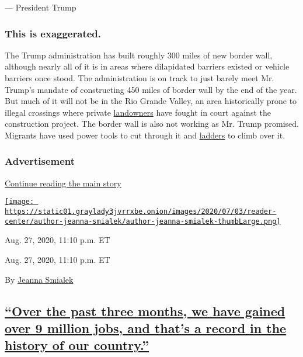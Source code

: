 --- President Trump

\hypertarget{this-is-exaggerated--2}{%
\subsubsection{This is exaggerated. }\label{this-is-exaggerated--2}}

The Trump administration has built roughly 300 miles of new border wall,
although nearly all of it is in areas where dilapidated barriers existed
or vehicle barriers once stood. The administration is on track to just
barely meet Mr. Trump's mandate of constructing 450 miles of border wall
by the end of the year. But much of it will not be in the Rio Grande
Valley, an area historically prone to illegal crossings where private
\href{https://www.nytimes3xbfgragh.onion/2020/05/29/us/politics/border-wall-coronavirus.html}{landowners}
have fought in court against the construction project. The border wall
is also not working as Mr. Trump promised. Migrants have used power
tools to cut through it and
\href{https://www.nytimes3xbfgragh.onion/2019/12/26/us/politics/trump-border-wall.html}{ladders}
to climb over it.

\hypertarget{advertisement-4}{%
\subsubsection{Advertisement}\label{advertisement-4}}

\protect\hyperlink{after-dfp-ad-mid5}{Continue reading the main story}

\href{https://www.nytimes3xbfgragh.onion/by/jeanna-smialek}{\texttt{[image: https://static01.graylady3jvrrxbe.onion/images/2020/07/03/reader-center/author-jeanna-smialek/author-jeanna-smialek-thumbLarge.png]}}

Aug. 27, 2020, 11:10 p.m. ET

Aug. 27, 2020, 11:10 p.m. ET

By \href{https://www.nytimes3xbfgragh.onion/by/jeanna-smialek}{Jeanna
Smialek}

\hypertarget{over-the-past-three-months-we-have-gained-over-9-million-jobs-and-thats-a-record-in-the-history-of-our-country}{%
\subsection{\texorpdfstring{\protect\hyperlink{over-the-past-three-months-we-have-gained-over-9-million-jobs-and-thats-a-record-in-the-history-of-our-country}{``Over
the past three months, we have gained over 9 million jobs, and that's a
record in the history of our
country.''}}{``Over the past three months, we have gained over 9 million jobs, and that's a record in the history of our country.''}}\label{over-the-past-three-months-we-have-gained-over-9-million-jobs-and-thats-a-record-in-the-history-of-our-country}}

